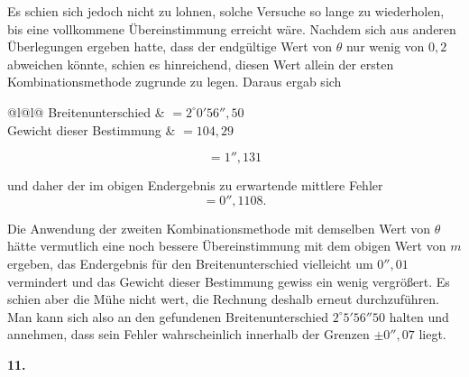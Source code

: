 Es schien sich jedoch nicht zu lohnen, solche Versuche so lange zu
wiederholen, bis eine vollkommene Übereinstimmung erreicht wäre.
Nachdem sich aus anderen Überlegungen ergeben hatte, dass der endgültige
Wert von \(\theta\) nur wenig von \(0{,}2\) abweichen könnte, schien es hinreichend,
diesen Wert allein der ersten Kombinationsmethode zugrunde zu legen.
Daraus ergab sich
\begin{center}
\begin{tabular}{@{}l@{\quad}l@{}}
Breitenunterschied & \(=2^\circ0'56''{,}50\)\\
Gewicht dieser Bestimmung & \(=104{,}29\)\\
\end{tabular}
\end{center}
\[
=1''{,}131
\]

\par\clearpage
\noindent\makebox[12mm][l]{}\par\medskip

\noindent und daher der im obigen Endergebnis zu erwartende mittlere Fehler
\[
=0''{,}1108.
\]

Die Anwendung der zweiten Kombinationsmethode mit demselben Wert
von \(\theta\) hätte vermutlich eine noch bessere Übereinstimmung mit dem obigen
Wert von \(m\) ergeben, das Endergebnis für den Breitenunterschied
vielleicht um \(0''{,}01\) vermindert und das Gewicht dieser Bestimmung gewiss
ein wenig vergrößert. Es schien aber die Mühe nicht wert, die Rechnung
deshalb erneut durchzuführen. Man kann sich also an den gefundenen
Breitenunterschied \(2^\circ5'56''50\) halten und annehmen, dass sein Fehler wahrscheinlich
innerhalb der Grenzen \(\pm0''{,}07\) liegt.

\begin{center}\textbf{11.}\end{center}

